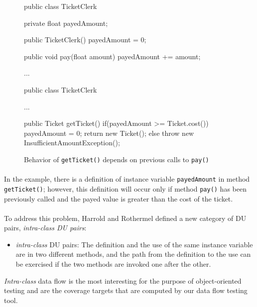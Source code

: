 \begin{figure}[t]
  \begin{minipage}{0.5\textwidth}
    \begin{jcode}
public class TicketClerk {
  private float payedAmount;
  
  public TicketClerk(){
    payedAmount = 0;
  }
  
  public void pay(float amount) {
    payedAmount += amount;
  }
  
  ...
}      
    \end{jcode}
  \end{minipage}
  \begin{minipage}{0.5\textwidth}
    \begin{jcode}
public class TicketClerk {
  
  ...
  
  public Ticket getTicket(){
    if(payedAmount >= Ticket.cost()){
      payedAmount = 0;
      return new Ticket();
    } else 
   throw new InsufficientAmountException();
  }
  
}    
    \end{jcode}    
  \end{minipage}
  \caption{Behavior of \texttt{getTicket()} depends on previous calls to \texttt{pay()}}
  \label{ticketclerk}
\end{figure}

\paragraph{}
In the example, there is a definition of instance variable \texttt{payedAmount} in method \texttt{getTicket()}; however, this definition will occur only if method \texttt{pay()} has been previously called and the payed value is greater than the cost of the ticket.
%
\paragraph{}
To address this problem, Harrold and Rothermel defined a new category of DU pairs, \textit{intra-class DU pairs}:

\begin{itemize}
  \item \textit{intra-class} DU pairs: The definition and the use of the same instance variable are in two different 
   methods, and the path from the definition to the use can be exercised if the two methods are invoked one
   after the other.
\end{itemize}

\textit{Intra-class} data flow is the most interesting for the purpose of object-oriented testing and are the coverage targets that are computed by our data flow testing tool.







